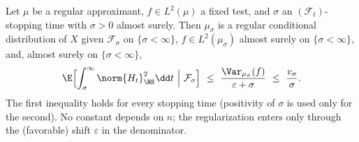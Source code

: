 \documentclass[../main.tex]{subfiles}
\begin{document}
\begin{theorem}
\label{thm:sol-lem-mm-restart-deweighting}
Let $\mu$ be a regular approximant, $f\in L^2(\mu)$ a fixed test, and $\sigma$ an
$(\mathcal F_t)$-stopping time with $\sigma>0$ almost surely.  Then $\mu_\sigma$ is a
regular conditional distribution of $X$ given $\mathcal F_\sigma$ on
$\{\sigma<\infty\}$, $f\in L^2(\mu_\sigma)$ almost surely on $\{\sigma<\infty\}$, and,
almost surely on $\{\sigma<\infty\}$,
\begin{equation}
  \E\Bigl[\int_\sigma^\infty\norm{H_t}_{\HS}^2\dd t\ \Big|\ \mathcal F_\sigma\Bigr]
  \ \le\ \frac{\Var_{\mu_\sigma}(f)}{\varepsilon+\sigma}
  \ \le\ \frac{v_\sigma}{\sigma}.
  \label{eq:sol-rdw-main}
\end{equation}
The first inequality holds for every stopping time (positivity of $\sigma$ is used only
for the second).  No constant depends on $n$; the regularization enters only through the
(favorable) shift $\varepsilon$ in the denominator.
\end{theorem}
\end{document}
